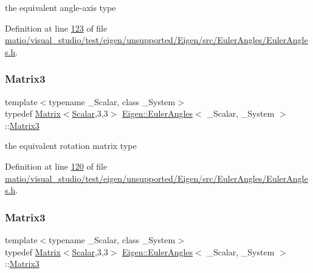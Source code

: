 the equivalent angle-\/axis type 

Definition at line \hyperlink{matio_2visual__studio_2test_2eigen_2unsupported_2_eigen_2src_2_euler_angles_2_euler_angles_8h_source_l00123}{123} of file \hyperlink{matio_2visual__studio_2test_2eigen_2unsupported_2_eigen_2src_2_euler_angles_2_euler_angles_8h_source}{matio/visual\+\_\+studio/test/eigen/unsupported/\+Eigen/src/\+Euler\+Angles/\+Euler\+Angles.\+h}.

\mbox{\label{class_eigen_1_1_euler_angles_ad0f0ee8240849b0f7d028695849cdbad}} 
\subsubsection{\texorpdfstring{Matrix3}{Matrix3}\hspace{0.1cm}{\footnotesize\ttfamily [1/2]}}
{\footnotesize\ttfamily template$<$typename \+\_\+\+Scalar, class \+\_\+\+System$>$ \\
typedef \hyperlink{group___core___module_class_eigen_1_1_matrix}{Matrix}$<$\hyperlink{class_eigen_1_1_euler_angles_a2ab1d433ac9683268446f8905ac31aac}{Scalar},3,3$>$ \hyperlink{class_eigen_1_1_euler_angles}{Eigen\+::\+Euler\+Angles}$<$ \+\_\+\+Scalar, \+\_\+\+System $>$\+::\hyperlink{class_eigen_1_1_euler_angles_ad0f0ee8240849b0f7d028695849cdbad}{Matrix3}}

the equivalent rotation matrix type 

Definition at line \hyperlink{matio_2visual__studio_2test_2eigen_2unsupported_2_eigen_2src_2_euler_angles_2_euler_angles_8h_source_l00120}{120} of file \hyperlink{matio_2visual__studio_2test_2eigen_2unsupported_2_eigen_2src_2_euler_angles_2_euler_angles_8h_source}{matio/visual\+\_\+studio/test/eigen/unsupported/\+Eigen/src/\+Euler\+Angles/\+Euler\+Angles.\+h}.

\mbox{\label{class_eigen_1_1_euler_angles_ad0f0ee8240849b0f7d028695849cdbad}} 
\subsubsection{\texorpdfstring{Matrix3}{Matrix3}\hspace{0.1cm}{\footnotesize\ttfamily [2/2]}}
{\footnotesize\ttfamily template$<$typename \+\_\+\+Scalar, class \+\_\+\+System$>$ \\
typedef \hyperlink{group___core___module_class_eigen_1_1_matrix}{Matrix}$<$\hyperlink{class_eigen_1_1_euler_angles_a2ab1d433ac9683268446f8905ac31aac}{Scalar},3,3$>$ \hyperlink{class_eigen_1_1_euler_angles}{Eigen\+::\+Euler\+Angles}$<$ \+\_\+\+Scalar, \+\_\+\+System $>$\+::\hyperlink{class_eigen_1_1_euler_angles_ad0f0ee8240849b0f7d028695849cdbad}{Matrix3}}

